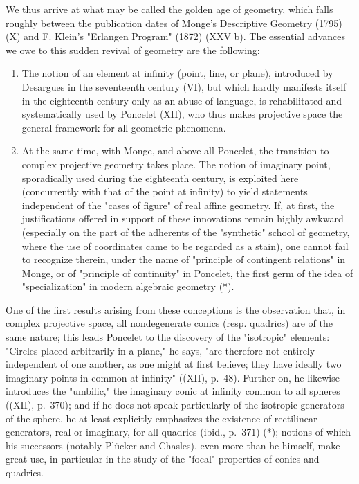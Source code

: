 We thus arrive at what may be called the golden age of geometry, which falls roughly between the publication dates of Monge's Descriptive Geometry (1795) (X) and F. Klein's "Erlangen Program" (1872) (XXV b). The essential advances we owe to this sudden revival of geometry are the following:

\begin{enumerate}
\def\labelenumi{\Alph{enumi})}
\item
  The notion of an element at infinity (point, line, or plane), introduced by Desargues in the seventeenth century (VI), but which hardly manifests itself in the eighteenth century only as an abuse of language, is rehabilitated and systematically used by Poncelet (XII), who thus makes projective space the general framework for all geometric phenomena.
\item
  At the same time, with Monge, and above all Poncelet, the transition to complex projective geometry takes place. The notion of imaginary point, sporadically used during the eighteenth century, is exploited here (concurrently with that of the point at infinity) to yield statements independent of the "cases of figure" of real affine geometry. If, at first, the justifications offered in support of these innovations remain highly awkward (especially on the part of the adherents of the "synthetic" school of geometry, where the use of coordinates came to be regarded as a stain), one cannot fail to recognize therein, under the name of "principle of contingent relations" in Monge, or of "principle of continuity" in Poncelet, the first germ of the idea of "specialization" in modern algebraic geometry (*).
\end{enumerate}

One of the first results arising from these conceptions is the observation that, in complex projective space, all nondegenerate conics (resp. quadrics) are of the same nature; this leads Poncelet to the discovery of the "isotropic" elements: "Circles placed arbitrarily in a plane," he says, "are therefore not entirely independent of one another, as one might at first believe; they have ideally two imaginary points in common at infinity" ((XII), p.~48). Further on, he likewise introduces the "umbilic," the imaginary conic at infinity common to all spheres ((XII), p.~370); and if he does not speak particularly of the isotropic generators of the sphere, he at least explicitly emphasizes the existence of rectilinear generators, real or imaginary, for all quadrics (ibid., p.~371) (*); notions of which his successors (notably Plücker and Chasles), even more than he himself, make great use, in particular in the study of the "focal" properties of conics and quadrics.

